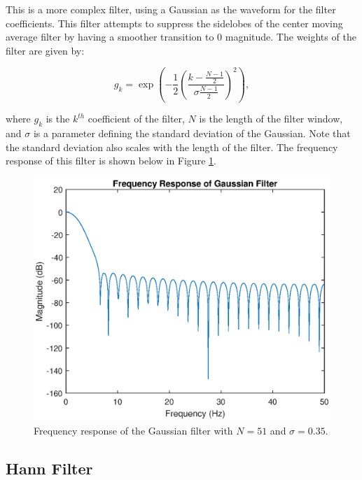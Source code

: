                 This is a more complex filter, using a Gaussian as the waveform for the filter coefficients. This filter attempts to suppress the sidelobes of the center moving average filter by having a smoother transition to 0 magnitude. The weights of the filter are given by:

                \begin{equation}
                    g_k = \exp(-\frac{1}{2}(\frac{k - \frac{N-1}{2}}{\sigma \frac{N-1}{2}})^2),
                \end{equation}

                where $g_k$ is the $k^{th}$ coefficient of the filter, $N$ is the length of the filter window, and $\sigma$ is a parameter defining the standard deviation of the Gaussian. Note that the standard deviation also scales with the length of the filter. The frequency response of this filter is shown below in Figure \ref{img_ga_filter}.

                \begin{figure}[!th]
                    \includegraphics[width=\textwidth]{Images/ga_filter.eps}
                    \centering
                    \caption{Frequency response of the Gaussian filter with $N=51$ and $\sigma = 0.35$.}
                    \label{img_ga_filter}
                \end{figure}

            \subsection{Hann Filter}

